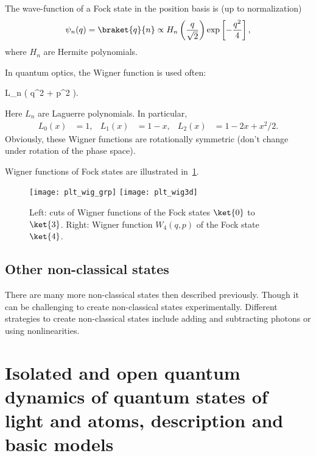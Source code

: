 \documentclass[fontsize=9pt,bookmarkpackage=false]{scrartcl}
\newcommand*{\mybx}[1]{\colorbox{mygr!15}{\hspace{1em}#1\hspace{1em}}}
\begin{document}
The wave-function of a Fock state in the position basis is (up to normalization)
\begin{equation}
  \psi_n (q) = \braket{ q }{ n }
  \propto H_n \left( \frac{ q }{ \sqrt{ 2 }} \right)
  \exp\left[ - \frac{ q ^2 }{ 4 } \right],
\end{equation}
where $H_n$ are Hermite polynomials.

In quantum optics, the Wigner function is used often:
\begin{empheq}[box=\mybx]{equation}
  W_n (q , p ) = \frac{ ( -1 )^{-1} }{ 2 \pi }
  \exp\left[ - \frac{ q^2 + p^2 }{ 2 } \right]
  L_n ( q^2 + p^2 ).
\end{empheq}
Here $L_n$ are Laguerre polynomials.
In particular,
\begin{align}
  L_0 (x) & = 1, &
  L_1 (x) & = 1 - x, &
  L_2 (x) & = 1 - 2 x + x^2 / 2.
\end{align}
Obviously, these Wigner functions are rotationally symmetric (don't change under rotation of the phase space).

Wigner functions of Fock states are illustrated in~\cref{fig:plt_wig_fock}.

\begin{figure}[htb]
  \centering
  \texttt{[image: plt\_wig\_grp]}
  \texttt{[image: plt\_wig3d]}
  \caption{
    Left: cuts of Wigner functions of the Fock states $\ket{0}$ to $\ket{3}$.
    Right: Wigner function $W_4(q,p)$ of the Fock state $\ket{4}$.
  }
  \label{fig:plt_wig_fock}
\end{figure}

\subsection{Other non-classical states} %
\label{sec:other_non_classical_states}

There are many more non-classical states then described previously.
Though it can be challenging to create non-classical states experimentally.
Different strategies to create non-classical states include adding and subtracting photons or using nonlinearities.




\newpage

\section{Isolated and open quantum dynamics of quantum states of light and atoms, description and basic models} %
\label{sec:isolated_and_open_quantum_dynamics_of_quantum_states_of_light_and_atoms_description_and_basic_models}
\end{document}
